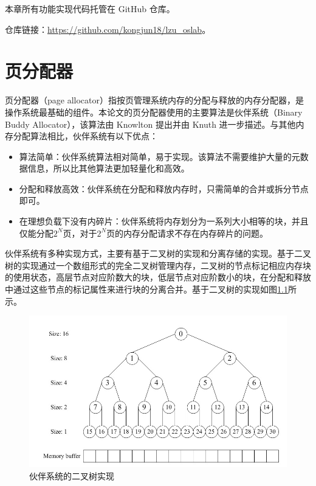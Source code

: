 \documentclass[AutoFakeBold]{LZUThesis}
\begin{document}
\begin{sloppypar}
本章所有功能实现代码托管在 GitHub 仓库。

仓库链接：\href{https://github.com/kongjun18/lzu_oslab}{https://github.com/kongjun18/lzu\_oslab}。

\chapter{页分配器}

页分配器（page allocator）指按页管理系统内存的分配与释放的内存分配器，是操作系统最基础的组件。本论文的页分配器使用的主要算法是伙伴系统（Binary Buddy Allocator），该算法由 Knowlton  提出并由 Knuth  进一步描述。与其他内存分配算法相比，伙伴系统有以下优点：

\begin{itemize}
\item
  算法简单：伙伴系统算法相对简单，易于实现。该算法不需要维护大量的元数据信息，所以比其他算法更加轻量化和高效。
\item
  分配和释放高效：伙伴系统在分配和释放内存时，只需简单的合并或拆分节点即可。
\item
  在理想负载下没有内碎片：伙伴系统将内存划分为一系列大小相等的块，并且仅能分配\(2^N\)页，对于\(2^N\)页的内存分配请求不存在内存碎片的问题。
\end{itemize}

伙伴系统有多种实现方式，主要有基于二叉树的实现和分离存储的实现。基于二叉树的实现通过一个数组形式的完全二叉树管理内存，二叉树的节点标记相应内存块的使用状态，高层节点对应阶数大的块，低层节点对应阶数小的块，在分配和释放中通过这些节点的标记属性来进行块的分离合并。基于二叉树的实现如图\ref{figure:buddy-system-binary-tree-implementation}所示。

\begin{figure}[H]
\centering
\includegraphics[scale=0.48]{images/buddy-system-binary-tree-implementation.jpg}
\caption{伙伴系统的二叉树实现}
\label{figure:buddy-system-binary-tree-implementation}
\end{figure}



\end{sloppypar}
\end{document}
